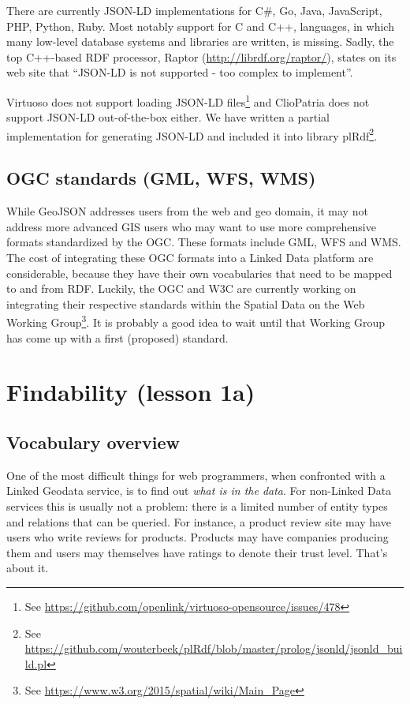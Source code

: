 \documentclass[a4paper]{scrartcl}
\begin{document}
There are currently JSON-LD implementations for C\#, Go, Java,
JavaScript, PHP, Python, Ruby.  Most notably support for C and C++,
languages, in which many low-level database systems and libraries are
written, is missing.  Sadly, the top C++-based RDF processor, Raptor
(\url{http://librdf.org/raptor/}), states on its web site that
``JSON-LD is not supported - too complex to implement''.

Virtuoso does not support loading JSON-LD files\footnote{See
  \url{https://github.com/openlink/virtuoso-opensource/issues/478}}
and ClioPatria does not support JSON-LD out-of-the-box either.  We
have written a partial implementation for generating JSON-LD and
included it into library plRdf\footnote{See
  \url{https://github.com/wouterbeek/plRdf/blob/master/prolog/jsonld/jsonld_build.pl}}.


\subsection{OGC standards (GML, WFS, WMS)}

While GeoJSON addresses users from the web and geo domain, it may not
address more advanced GIS users who may want to use more comprehensive
formats standardized by the OGC.  These formats include GML, WFS and
WMS.  The cost of integrating these OGC formats into a Linked Data
platform are considerable, because they have their own vocabularies
that need to be mapped to and from RDF.  Luckily, the OGC and W3C are
currently working on integrating their respective standards within the
Spatial Data on the Web Working Group\footnote{See
  \url{https://www.w3.org/2015/spatial/wiki/Main_Page}}.  It is
probably a good idea to wait until that Working Group has come up with
a first (proposed) standard.


\section{Findability (lesson 1a)}

\subsection{Vocabulary overview}

One of the most difficult things for web programmers, when confronted
with a Linked Geodata service, is to find out \emph{what is in the
  data}.  For non-Linked Data services this is usually not a problem:
there is a limited number of entity types and relations that can be
queried.  For instance, a product review site may have users who write
reviews for products.  Products may have companies producing them and
users may themselves have ratings to denote their trust level.  That's
about it.
\end{document}
